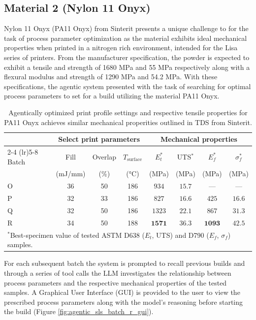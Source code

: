 \subsection{Material 2 (Nylon 11 Onyx)}

Nylon 11 Onyx (PA11 Onyx) from Sinterit presents a unique challenge to for the
task of process parameter optimization as the material exhibits ideal mechanical
properties when printed in a nitrogen rich environment, intended for the Lisa
series of printers. From the manufacturer specification, the powder is expected
to exhibit a tensile and strength of 1680 MPa and 55 MPa respectively along with
a flexural modulus and strength of 1290 MPa and 54.2 MPa. With these
specifications, the agentic system presented with the task of searching for
optimal process parameters to set for a build utilizing the material PA11 Onyx.

\begin{table}[t]
  \centering
  \begin{tabular}{lccccccc}
    \toprule
    & \multicolumn{3}{c}{Select print parameters} & \multicolumn{4}{c}{Mechanical properties} \\
    \cmidrule(lr){2-4} \cmidrule(lr){5-8}
    Batch & Fill & Overlap & $T_\mathrm{surface}$ & $E_t^{*}$ & UTS$^{*}$ & $E_f^{*}$ & $\sigma_f^{*}$ \\
    & (mJ/mm) & (\%) & (\si{\celsius}) & (MPa) & (MPa) & (MPa) & (MPa) \\
    \midrule
    O   & 36  & 50  & 186 & $934$  & $15.7$ & ---    & --- \\
    P   & 32  & 33  & 186 & $827$  & $16.6$ & $425$  & $16.6$ \\
    Q   & 32  & 50  & 186 & $1323$ & $22.1$ & $867$  & $31.3$ \\
    R   & 34  & 50  & 188 & $\bm{1571}$ & $\bm{36.3}$ & $\bm{1093}$ & $\bm{42.5}$ \\
    \bottomrule
    \multicolumn{8}{l}{\footnotesize $^{*}$Best-specimen value of tested
      ASTM D638 (\(E_t\), UTS) and D790 (\(E_f\), \(\sigma_f\)) samples.} \\
  \end{tabular}
  \caption{
    Agentically optimized print profile settings and respective tensile
    properties for PA11 Onyx achieves similar mechanical properities outlined in
    TDS from Sinterit.
  }
  \label{tab:agentic-sls-material-2}
\end{table}

For each subsequent batch the system is prompted to recall previous builds and
through a series of tool calls the LLM investigates the relationship between
process parameters and the respective mechanical properties of the tested
samples. A Graphical User Interface (GUI) is provided to the user to view the
prescribed process parameters along with the model's reasoning before starting
the build (Figure \ref{fig:agentic_sls_batch_r_gui}).

